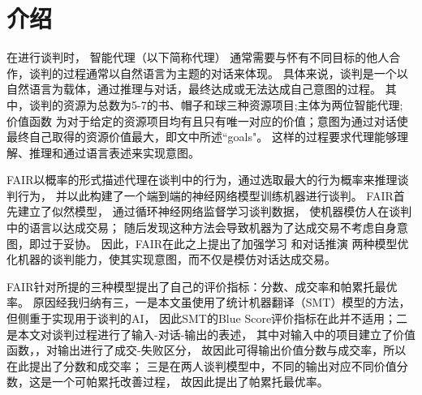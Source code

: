 \section{介绍}

\label{section:introduction}
在进行谈判时，
智能代理（以下简称代理）
通常需要与怀有不同目标的他人合作，谈判的过程通常以自然语言为主题的对话来体现。
具体来说，谈判是一个以自然语言为载体，通过推理与对话，最终达成或无法达成自己意图的过程。
其中，谈判的资源为总数为5-7的书、帽子和球三种资源项目;主体为两位智能代理;
价值函数
为对于给定的资源项目均有且只有唯一对应的价值；意图为通过对话使最终自己取得的资源价值最大，即文中所述``goals"。
这样的过程要求代理能够理解、推理和通过语言表述来实现意图。

FAIR以概率的形式描述代理在谈判中的行为，通过选取最大的行为概率来推理谈判行为，
并以此构建了一个端到端的神经网络模型训练机器进行谈判。
FAIR首先建立了似然模型，
通过循环神经网络监督学习谈判数据，
使机器模仿人在谈判中的语言以达成交易；
随后发现这种方法会导致机器为了达成交易不考虑自身意图，即过于妥协。
因此，FAIR在此之上提出了加强学习
和对话推演
两种模型优化机器的谈判能力，使其实现意图，而不仅是模仿对话达成交易。

FAIR针对所提的三种模型提出了自己的评价指标：分数、成交率和帕累托最优率。
原因经我归纳有三，一是本文虽使用了统计机器翻译（SMT）模型的方法，但侧重于实现用于谈判的AI，
因此SMT的Blue Score评价指标在此并不适用；二是本文对谈判过程进行了输入-对话-输出的表述，
其中对输入中的项目建立了价值函数，，对输出进行了成交-失败区分，
故因此可得输出价值分数与成交率，所以在此提出了分数和成交率；
三是在两人谈判模型中，不同的输出对应不同价值分数，这是一个可帕累托改善过程，
故因此提出了帕累托最优率。